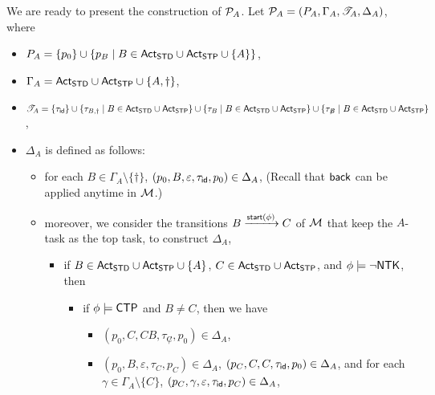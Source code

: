 We are ready to present the construction of ${\mathcal{P} }_A$. Let ${\mathcal{P} }_A = (P_A, \Gamma_A, {\mathscr{T} }_A, \Delta_A)$, where 
\begin{itemize}
\item $P_{A} = \{p_0\}\cup\{ p_{B}\mid B \in  {\sf Act}_{\sf STD} \cup {\sf Act}_{\sf STP} \cup \{A\}\}$,
\item $\Gamma_{A} = {\sf Act}_{\sf STD} \cup {\sf Act}_{\sf STP} \cup \{A, \dag\}$, 
\item ${\mathscr{T} }_A = \{\tau_{\mathsf{id}} \}\cup \{\tau_{B, \dag} \mid B \in {\sf Act}_{\sf STD} \cup {\sf Act}_{\sf STP} \} \cup \{\tau_{B} \mid B \in {\sf Act}_{\sf STD} \cup {\sf Act}_{\sf STP}\}  \cup \{\tau_{\not B} \mid B \in {\sf Act}_{\sf STD} \cup {\sf Act}_{\sf STP}\}$, 
\item $\Delta_{A}$ is defined as follows:
        \begin{itemize}
            \item for each $B \in \Gamma_{A} \setminus \{\dag\}$, $(p_0, B, \varepsilon, \tau_{\mathsf{id}}, p_0) \in \Delta_{A}$, (Recall that ${\mathsf{back} }$ can be applied anytime in ${\mathcal{M} }$.)
	    \item moreover, we consider the transitions $B \xrightarrow{{\mathsf{start} }(\phi)} C$ of ${\mathcal{M} }$ that keep the $A$-task as the top task, to construct $\Delta_A$, 
			\begin{itemize}
				\item if $B \in {\sf Act}_{\sf STD} \cup {\sf Act}_{\sf STP} \cup \{A\}$, $C \in {\sf Act}_{\sf STD} \cup {\sf Act}_{\sf STP}$, and $\phi \models \neg {\sf NTK}$, then 
				\begin{itemize}
				\item if $\phi \models {\sf CTP}$ and $B \neq C$, then we have 
				\begin{itemize}
					\item $(p_0, C, CB, \tau_{\not C}, p_0) \in \Delta_{A}$, 
					\item $(p_0, B, \varepsilon, \tau_{C}, p_C) \in \Delta_{A}$, $(p_C, C, C, \tau_{\mathsf{id}}, p_0)  \in \Delta_{A}$, and for each $\gamma \in \Gamma_A \setminus \{C\}$, $(p_C, \gamma, \varepsilon, \tau_{\mathsf{id}}, p_C) \in \Delta_{A}$, 

\end{itemize}
\end{itemize}
\end{itemize}
\end{itemize}
\end{itemize}
